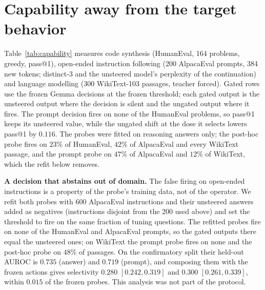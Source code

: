 \documentclass{article}
\begin{document}
\section{Capability away from the target behavior}
\label{app:capability}

Table~\ref{tab:capability} measures code synthesis (HumanEval, 164 problems,
greedy, pass@1), open-ended instruction following (200 AlpacaEval prompts, 384
new tokens; distinct-3 and the unsteered model's perplexity of the
continuation) and language modelling (300 WikiText-103 passages, teacher
forced). Gated rows use the frozen Gemma decisions at the frozen threshold;
each gated output is the unsteered output where the decision is silent and the
ungated output where it fires. The prompt decision fires on none of the
HumanEval problems, so pass@1 keeps its unsteered value, while the ungated
shift at the dose it selects lowers pass@1 by $0.116$. The probes were fitted
on reasoning answers only; the post-hoc probe fires on $23\%$ of HumanEval,
$42\%$ of AlpacaEval and every WikiText passage, and the prompt probe on
$47\%$ of AlpacaEval and $12\%$ of WikiText, which the refit below removes.

\begin{table}[h]\footnotesize\setlength{\tabcolsep}{3pt}
\centering
{}
\caption{Capability under the Gemma operators. Intervals are paired bootstrap
intervals over problems.}
\label{tab:capability}
\end{table}

\textbf{A decision that abstains out of domain.} The false firing on
open-ended instructions is a property of the probe's training data, not of the
operator. We refit both probes with 600 AlpacaEval instructions and their
unsteered answers added as negatives (instructions disjoint from the 200 used
above) and set the threshold to fire on the same fraction of tuning questions.
The refitted probes fire on none of the HumanEval and AlpacaEval prompts, so
the gated outputs there equal the unsteered ones; on WikiText the prompt probe
fires on none and the post-hoc probe on $48\%$ of passages. On the
confirmatory split their held-out AUROC is $0.735$ (answer) and $0.719$
(prompt), and composing them with the frozen actions gives selectivity $0.280$
$[0.242, 0.319]$ and $0.300$ $[0.261, 0.339]$, within $0.015$ of the frozen
probes. This analysis was not part of the protocol.
\end{document}
